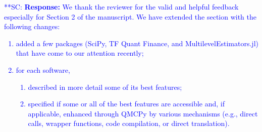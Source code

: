 \documentclass{amsart}
\newcommand{\scnote}[1]{ {\textcolor{blue}  {\mbox{**SC:} #1}}}
\begin{document}
%
%

\vspace{10ex}

\scnote{
{\bf Response:} We thank the reviewer for the valid and helpful feedback especially for Section 2 of the manuscript. We have extended the section with the following changes: 
\begin{enumerate}
 \item added a few packages (SciPy, TF Quant Finance, and MultilevelEstimators.jl) that have come to our attention recently; 
 \item for each software, 
    \begin{enumerate}
        \item described in more detail some of its best features;
        \item specified if some or all of the best features are accessible and, if applicable, enhanced through QMCPy by various mechanisms (e.g., direct calls, wrapper functions, code compilation, or direct translation).
    \end{enumerate}
\end{enumerate}
 }
\end{document}
